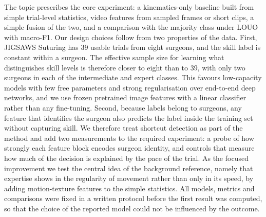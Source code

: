 The topic prescribes the core experiment: a kinematics-only baseline built from simple trial-level statistics, video features from sampled frames or short clips, a simple fusion of the two, and a comparison with the majority class under LOUO with macro-F1. Our design choices follow from two properties of the data. First, JIGSAWS Suturing has 39 usable trials from eight surgeons, and the skill label is constant within a surgeon. The effective sample size for learning what distinguishes skill levels is therefore closer to eight than to 39, with only two surgeons in each of the intermediate and expert classes. This favours low-capacity models with few free parameters and strong regularisation over end-to-end deep networks, and we use frozen pretrained image features with a linear classifier rather than any fine-tuning. Second, because labels belong to surgeons, any feature that identifies the surgeon also predicts the label inside the training set without capturing skill. We therefore treat shortcut detection as part of the method and add two measurements to the required experiment: a probe of how strongly each feature block encodes surgeon identity, and controls that measure how much of the decision is explained by the pace of the trial. As the focused improvement we test the central idea of the background reference, namely that expertise shows in the regularity of movement rather than only in its speed, by adding motion-texture features to the simple statistics. All models, metrics and comparisons were fixed in a written protocol before the first result was computed, so that the choice of the reported model could not be influenced by the outcome.
